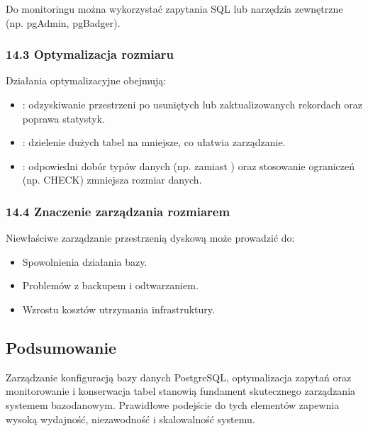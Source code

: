 \documentclass[a4paper,11pt,openany,english]{sphinxmanual}
\begin{document}
\sphinxAtStartPar
Do monitoringu można wykorzystać zapytania SQL lub narzędzia zewnętrzne (np. pgAdmin, pgBadger).


\subsubsection{14.3 Optymalizacja rozmiaru}
\label{\detokenize{rozdzial2/Konfiguracja_baz_danych/Konfiguracja_baz_danych:optymalizacja-rozmiaru}}
\sphinxAtStartPar
Działania optymalizacyjne obejmują:
\begin{itemize}
\item {} 
\sphinxAtStartPar
{}: odzyskiwanie przestrzeni po usuniętych lub zaktualizowanych rekordach oraz poprawa statystyk.

\item {} 
\sphinxAtStartPar
{}: dzielenie dużych tabel na mniejsze, co ułatwia zarządzanie.

\item {} 
\sphinxAtStartPar
{}: odpowiedni dobór typów danych (np.  zamiast ) oraz stosowanie ograniczeń (np. CHECK) zmniejsza rozmiar danych.

\end{itemize}


\subsubsection{14.4 Znaczenie zarządzania rozmiarem}
\label{\detokenize{rozdzial2/Konfiguracja_baz_danych/Konfiguracja_baz_danych:znaczenie-zarzadzania-rozmiarem}}
\sphinxAtStartPar
Niewłaściwe zarządzanie przestrzenią dyskową może prowadzić do:
\begin{itemize}
\item {} 
\sphinxAtStartPar
Spowolnienia działania bazy.

\item {} 
\sphinxAtStartPar
Problemów z backupem i odtwarzaniem.

\item {} 
\sphinxAtStartPar
Wzrostu kosztów utrzymania infrastruktury.

\end{itemize}


\subsection{Podsumowanie}
\label{\detokenize{rozdzial2/Konfiguracja_baz_danych/Konfiguracja_baz_danych:podsumowanie}}
\sphinxAtStartPar
Zarządzanie konfiguracją bazy danych PostgreSQL, optymalizacja zapytań oraz monitorowanie i konserwacja tabel stanowią fundament skutecznego zarządzania systemem bazodanowym. Prawidłowe podejście do tych elementów zapewnia wysoką wydajność, niezawodność i skalowalność systemu.
\end{document}
